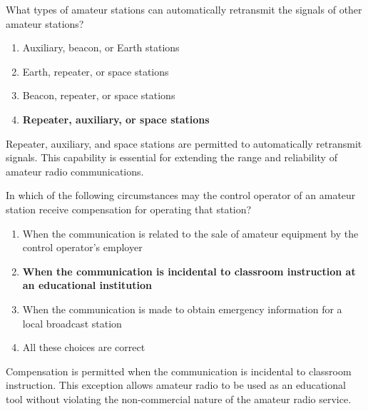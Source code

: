\begin{tcolorbox}[colback=gray!10!white,colframe=black!75!black,title={T1D07}]
    What types of amateur stations can automatically retransmit the signals of other amateur stations?
    \begin{enumerate}[label=\Alph*),noitemsep]
        \item Auxiliary, beacon, or Earth stations
        \item Earth, repeater, or space stations
        \item Beacon, repeater, or space stations
        \item \textbf{Repeater, auxiliary, or space stations}
    \end{enumerate}
\end{tcolorbox}

 Repeater, auxiliary, and space stations are permitted to automatically retransmit signals. This capability is essential for extending the range and reliability of amateur radio communications.

\begin{tcolorbox}[colback=gray!10!white,colframe=black!75!black,title={T1D08}]
    In which of the following circumstances may the control operator of an amateur station receive compensation for operating that station?
    \begin{enumerate}[label=\Alph*),noitemsep]
        \item When the communication is related to the sale of amateur equipment by the control operator's employer
        \item \textbf{When the communication is incidental to classroom instruction at an educational institution}
        \item When the communication is made to obtain emergency information for a local broadcast station
        \item All these choices are correct
    \end{enumerate}
\end{tcolorbox}

Compensation is permitted when the communication is incidental to classroom instruction. This exception allows amateur radio to be used as an educational tool without violating the non-commercial nature of the amateur radio service.

